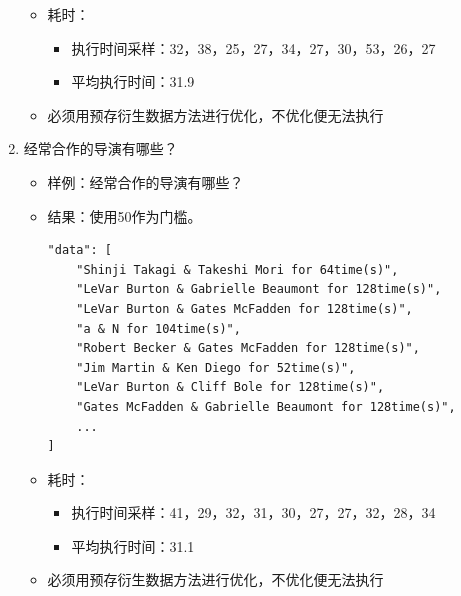 \documentclass{ctexrep}
\begin{document}
\begin{enumerate}
\begin{itemize}
        			\item 耗时：
        			    \begin{itemize}
        			        \item 执行时间采样：32，38，25，27，34，27，30，53，26，27
        			        \item 平均执行时间：31.9
        			    \end{itemize}
        		    \item 必须用预存衍生数据方法进行优化，不优化便无法执行
        		\end{itemize}
    		\item 经常合作的导演有哪些？
        		\begin{itemize}
        			\item 样例：经常合作的导演有哪些？
        			\item 结果：使用50作为门槛。
        			    \begin{lstlisting}
"data": [
    "Shinji Takagi & Takeshi Mori for 64time(s)",
    "LeVar Burton & Gabrielle Beaumont for 128time(s)",
    "LeVar Burton & Gates McFadden for 128time(s)",
    "a & N for 104time(s)",
    "Robert Becker & Gates McFadden for 128time(s)",
    "Jim Martin & Ken Diego for 52time(s)",
    "LeVar Burton & Cliff Bole for 128time(s)",
    "Gates McFadden & Gabrielle Beaumont for 128time(s)",
    ...
]
			            \end{lstlisting}
        			\item 耗时：
        			    \begin{itemize}
        			        \item 执行时间采样：41，29，32，31，30，27，27，32，28，34
        			        \item 平均执行时间：31.1
        			    \end{itemize}
        		    \item 必须用预存衍生数据方法进行优化，不优化便无法执行
        		\end{itemize}
	    \end{enumerate}
\end{document}
